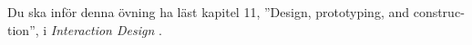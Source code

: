 Du ska inför denna övning ha läst kapitel 11, 
''\foreignlanguage{english}{Design, prototyping, and construction}'', 
i \emph{Interaction Design} \citep{Sharp2011idb}.
